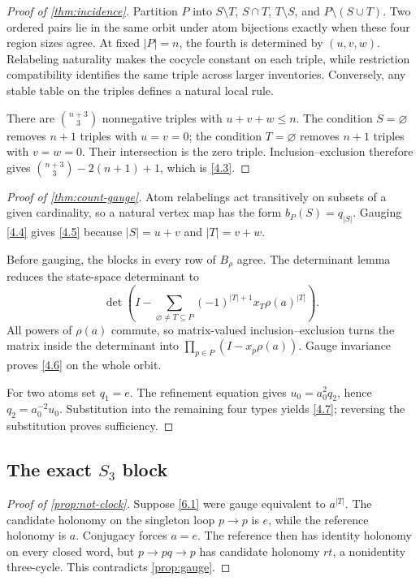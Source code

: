 \begin{proof}[Proof of \cref{thm:incidence}]
Partition $P$ into
$S\setminus T$, $S\cap T$, $T\setminus S$, and
$P\setminus(S\cup T)$.  Two ordered pairs lie in the same orbit under atom
bijections exactly when these four region sizes agree.  At fixed $|P|=n$,
the fourth is determined by $(u,v,w)$.  Relabeling naturality makes the
cocycle constant on each triple, while restriction compatibility identifies
the same triple across larger inventories.  Conversely, any stable table on
the triples defines a natural local rule.

There are $\binom{n+3}{3}$ nonnegative triples with $u+v+w\le n$.  The
condition $S=\varnothing$ removes $n+1$ triples with $u=v=0$; the condition
$T=\varnothing$ removes $n+1$ triples with $v=w=0$.  Their intersection is
the zero triple.  Inclusion--exclusion therefore gives
$\binom{n+3}{3}-2(n+1)+1$, which is \eqref{4.3}.
\end{proof}

\begin{proof}[Proof of \cref{thm:count-gauge}]
Atom relabelings act transitively on subsets of a given cardinality, so a
natural vertex map has the form $b_P(S)=q_{|S|}$.  Gauging \eqref{4.4}
gives \eqref{4.5} because $|S|=u+v$ and $|T|=v+w$.

Before gauging, the blocks in every row of $B_\rho$ agree.  The determinant
lemma reduces the state-space determinant to
\[
\det\!\left(I-\sum_{\varnothing\ne T\subseteq P}
 (-1)^{|T|+1}x_T\rho(a)^{|T|}\right).
\]
All powers of $\rho(a)$ commute, so matrix-valued inclusion--exclusion turns
the matrix inside the determinant into
$\prod_{p\in P}(I-x_p\rho(a))$.  Gauge invariance proves \eqref{4.6} on the
whole orbit.

For two atoms set $q_1=e$.  The refinement equation gives
$u_0=a_0^2q_2$, hence $q_2=a_0^{-2}u_0$.  Substitution into the remaining
four types yields \eqref{4.7}; reversing the substitution proves
sufficiency.
\end{proof}

\subsection{The exact \texorpdfstring{$S_3$}{S3} block}

\begin{proof}[Proof of \cref{prop:not-clock}]
Suppose \eqref{6.1} were gauge equivalent to $a^{|T|}$.  The candidate
holonomy on the singleton loop $p\to p$ is $e$, while the reference
holonomy is $a$.  Conjugacy forces $a=e$.  The reference then has identity
holonomy on every closed word, but $p\to pq\to p$ has candidate holonomy
$rt$, a nonidentity three-cycle.  This contradicts \cref{prop:gauge}.
\end{proof}

